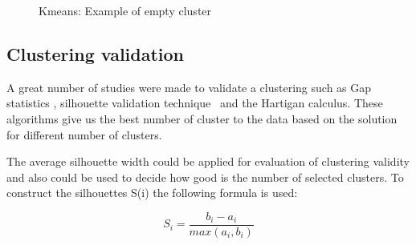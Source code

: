 \documentclass[a4paper,11pt]{article}
\begin{document}
\begin{figure}[ht!]
\begin{centering}
{      \label{fig:emptyb}
    }
  \end{centering}
  \caption{Kmeans: Example of empty cluster}
  \label{fig:empty}

\end{figure}
  
\subsection{Clustering validation}

A  great number  of  studies were  made to  validate  a clustering  such as  Gap
statistics \cite{STD}, silhouette validation technique~\cite{SIL} and the Hartigan calculus\cite{HT}. These algorithms give us the best
number of cluster to the data based on the solution for different number of clusters.

 The  average silhouette  width could  be applied  for evaluation  of clustering
 validity and also  could be used to  decide how good is the  number of selected
 clusters. To construct the silhouettes S(i) the following formula is used:

\begin{equation}
S_i = \frac{b_i-a_i}{max(a_i,b_i)}
\end{equation}
\end{document}
